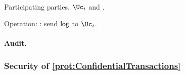 \begin{protocol}~\label{prot:ConfidentialTransactions:History}
	\item[Participating parties.] $\Uc_i$ and \Cc.
		
	\item Operation: \Cc: send  $\mathsf{log}$ to $\Uc_i$.
	
\end{protocol}


\paragraph{Audit.} 


\subsubsection{Security of \cref{prot:ConfidentialTransactions}}
\begin{theorem}\label{thm:ConfidentialTransactions}
\end{theorem}



